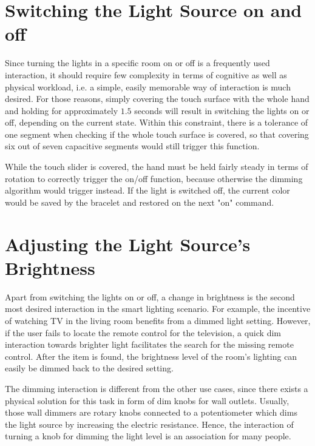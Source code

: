 \section{Switching the Light Source on and off}
\label{sec:onoff}
Since turning the lights in a specific room on or off is a frequently used interaction, it should require few complexity in terms of cognitive as well as physical workload, i.e. a simple, easily memorable way of interaction is much desired. For those reasons, simply covering the touch surface with the whole hand and holding for approximately $1.5$ seconds will result in switching the lights on or off, depending on the current state. Within this constraint, there is a tolerance of one segment when checking if the whole touch surface is covered, so that covering six out of seven capacitive segments would still trigger this function.

While the touch slider is covered, the hand must be held fairly steady in terms of rotation to correctly trigger the on/off function, because otherwise the dimming algorithm would trigger instead. If the light is switched off, the current color would be saved by the bracelet and restored on the next "on" command.

\section{Adjusting the Light Source's Brightness}
Apart from switching the lights on or off, a change in brightness is the second most desired interaction in the smart lighting scenario. For example, the incentive of watching TV in the living room benefits from a dimmed light setting. However, if the user fails to locate the remote control for the television, a quick dim interaction towards brighter light facilitates the search for the missing remote control. After the item is found, the brightness level of the room's lighting can easily be dimmed back to the desired setting.

The dimming interaction is different from the other use cases, since there exists a physical solution for this task in form of dim knobs for wall outlets. Usually, those wall dimmers are rotary knobs connected to a potentiometer which dims the light source by increasing the electric resistance. Hence, the interaction of turning a knob for dimming the light level is an association for many people.


